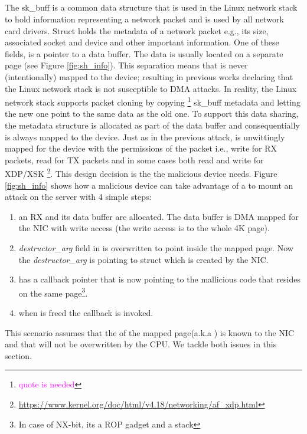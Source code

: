 \subsection{\shinfo}
The sk\_buff is a common data structure that is used in the Linux network stack to hold information  representing a network packet and is used by all network card drivers. Struct \skb holds the metadata of a network packet e.g., its size, associated socket and device and other important information. One of these fields, is a pointer to a data buffer. The data is usually located on a separate page (see Figure \ref{fig:sh_info}). This  separation means that \skb is never (intentionally) mapped to the device; resulting in previous works \cite{thunder} declaring that the Linux network stack is not susceptible to DMA attacks. In reality, the Linux network stack supports packet cloning by copying \footnote{\textcolor{magenta}{quote is needed}} sk\_buff metadata and letting the new one point to the same data as the old one. To support this data sharing, the \shinfo metadata structure is allocated as part of the data buffer and consequentially is always mapped to the device. Just as in the previous attack, \shinfo is unwittingly mapped for the device with the permissions of the packet i.e., write for RX packets, read for TX packets and in some cases both read and write for XDP/XSK \footnote{\url{https://www.kernel.org/doc/html/v4.18/networking/af_xdp.html}}. This design decision is the \oportunity the malicious device needs. Figure \ref{fig:sh_info} shows how a malicious device can take advantage of a \shinfo to mount an attack on the server with 4 simple steps:
\begin{enumerate}[label=(\alph*)]
    \item an RX \skb and its data buffer are allocated. The data buffer is DMA mapped for the NIC with write access (the write access is to the whole 4K page). 
    \item \textit{destructor\_arg} field in \shinfo is overwritten to point inside the mapped page. Now the \textit{destructor\_arg} is pointing to struct \uarg which is created by the NIC.
    \item \uarg has a callback pointer that is now pointing to the mallicious code that resides on the same page\footnote{In case of NX-bit, its a ROP gadget and a stack}.
    \item when \skb is freed the callback is invoked.
\end{enumerate}
This scenario assumes that the \kva of the mapped page(a.k.a \means) is known to the NIC and that \shinfo will not be overwritten by the CPU. We tackle both issues in this section.
